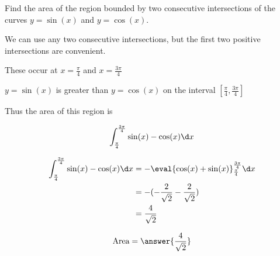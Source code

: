 \documentclass{ximera}
\author{Steven Gubkin}
\begin{document}
\begin{exercise}



Find the area of the region bounded by two consecutive intersections of the curves $y=\sin(x)$ and $y = \cos(x)$.

\begin{hint}
	We can use any two consecutive intersections, but the first two positive intersections are convenient.

	These occur at $x = \frac{\pi}{4}$ and $x = \frac{3\pi}{4}$
\end{hint}

\begin{hint}
	$y = \sin(x)$ is greater than $y=\cos(x)$ on the interval $[\frac{\pi}{4},\frac{3\pi}{4}]$
\end{hint}

\begin{hint}
	Thus the area of this region is

	\[
	\int_{\frac{\pi}{4}}^{\frac{3\pi}{4}} \sin(x) - \cos(x) \d x
	\]
\end{hint}

\begin{hint}
	\begin{align*}
		\int_{\frac{\pi}{4}}^{\frac{3\pi}{4}} \sin(x) - \cos(x) \d x &=  -\eval{\cos(x)+\sin(x)}_{\frac{\pi}{4}}^{\frac{3\pi}{4}}  \d x\\
		&=-(-\frac{2}{\sqrt{2}} - \frac{2}{\sqrt{2}})\\
		&= \frac{4}{\sqrt{2}}
	\end{align*}
\end{hint}

\begin{prompt}
	\[
		\textrm{Area} = \answer{\frac{4}{\sqrt{2}}}
	\]
\end{prompt}

\end{exercise}
\end{document}
